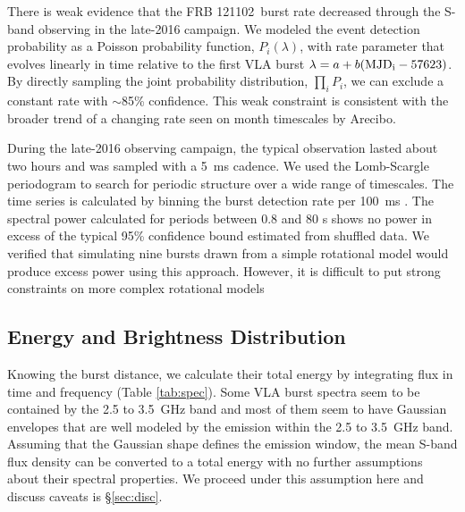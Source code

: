 \documentclass[twocolumn]{aastex61}
\newcommand{\frb}{FRB 121102}
\begin{document}
There is weak evidence that the \frb\ burst rate decreased through the S-band observing in the late-2016 campaign. We modeled the event detection probability as a Poisson probability function, $P_i(\lambda)$, with rate parameter that evolves linearly in time relative to the first VLA burst $\lambda = a + b (\rm{MJD}_i - 57623)$. By directly sampling the joint probability distribution, $\prod_{i} P_i$, we can exclude a constant rate with $\sim$85\% confidence. This weak constraint is consistent with the broader trend of a changing rate seen on month timescales by Arecibo.


During the late-2016 observing campaign, the typical observation lasted about two hours and was sampled with a 5~ms cadence. We used the Lomb-Scargle periodogram \citep{1982ApJ...263..835S} to search for periodic structure over a wide range of timescales. The time series is calculated by binning the burst detection rate per 100~ms \citep[always either 0 or 1, see also][]{2011MNRAS.417.1871P}. 
The spectral power calculated for periods between 0.8 and 80 s shows no power in excess of the typical 95\% confidence bound estimated from shuffled data. We verified that simulating nine bursts drawn from a simple rotational model would produce excess power using this approach. However, it is difficult to put strong constraints on more complex rotational models \citep[e.g., with wide pulse phase windows or glitches;][]{2007ApJ...663..497C, 2013Natur.497..591A}

\subsection{Energy and Brightness Distribution}
\label{sec:disn}
Knowing the burst distance, we calculate their total energy by integrating flux in time and frequency (Table \ref{tab:spec}). Some VLA burst spectra seem to be contained by the 2.5 to 3.5~GHz band and most of them seem to have Gaussian envelopes that are well modeled by the emission within the 2.5 to 3.5~GHz band. Assuming that the Gaussian shape defines the emission window, the mean S-band flux density can be converted to a total energy with no further assumptions about their spectral properties. We proceed under this assumption here and discuss caveats is \S \ref{sec:disc}.
\end{document}
